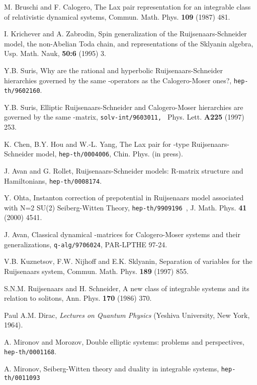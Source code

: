 \documentclass[a4paper,12pt]{article}
\begin{document}
\begin{thebibliography}{99}
  M. Bruschi and F. Calogero, The Lax pair representation for an
integrable class of relativistic dynamical systems, Commun.
Math. Phys. \textbf{109} (1987) 481.

  I. Krichever and A. Zabrodin, Spin generalization of the
Ruijsenaars-Schneider model, the non-Abelian \coordHE{} Toda
chain, and representations of the Sklyanin algebra, Usp.
Math. Nauk, \textbf{50:6} (1995) 3.

  Y.B. Suris, Why are the rational and hyperbolic
Ruijsenaars-Schneider hierarchies governed by the same
\coordHE{}-operators as the Calogero-Moser ones?,
\texttt{hep-th/9602160}.

  Y.B. Suris, Elliptic Ruijsenaars-Schneider and Calogero-Moser
hierarchies are governed by the same \coordHE{}-matrix,
\texttt{solv-int/9603011, } Phys. Lett. \textbf{A225}
(1997) 253.

	K. Chen, B.Y. Hou and W.-L. Yang, The Lax pair for \coordHE{}
-type Ruijsenaars-Schneider model, \texttt{hep-th/0004006}, Chin. Phys.
(in press).

	J. Avan and G. Rollet, \coordHE{} Ruijsenaars-Schneider
models: R-matrix structure and Hamiltonians,
\texttt{hep-th/0008174}.


	Y. Ohta, Instanton correction of prepotential in Ruijsenaars
model associated with N=2 SU(2) Seiberg-Witten Theory,
\texttt{hep-th/9909196 },  J. Math. Phys. \textbf{41} (2000)
4541.

	 J. Avan, Classical dynamical \coordHE{}-matrices for
Calogero-Moser systems and their generalizations, \texttt{q-alg/9706024},
PAR-LPTHE 97-24.

  V.B. Kuznetsov, F.W. Nijhoff and E.K. Sklyanin, Separation of
variables for the Ruijsenaars system, Commun. Math. Phys.
\textbf{189} (1997) 855.

  S.N.M. Ruijsenaars and H. Schneider, A new class of integrable
systems and its relation to solitons, Ann. Phys.
\textbf{170} (1986) 370.

	 Paul A.M. Dirac, \textit{Lectures on Quantum Physics}
(Yeshiva University, New York, 1964).

  A. Mironov and Morozov, Double elliptic systems: problems and
perspectives, \texttt{hep-th/0001168}.

 A. Mironov, Seiberg-Witten theory and duality in integrable
systems, \texttt{hep-th/0011093}


\end{thebibliography}
\end{document}
